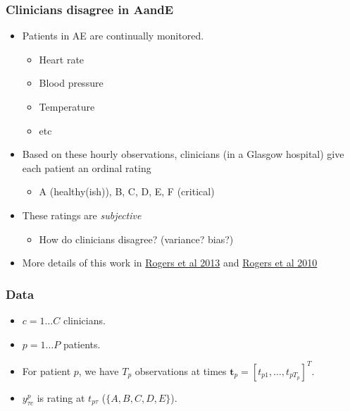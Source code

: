 

\begin{frame}
	\frametitle{Clinicians disagree in AandE}
	\begin{itemize}
		\item Patients in \ac{AE} are continually monitored.
		\begin{itemize}
			\item Heart rate
			\item Blood pressure
			\item Temperature
			\item etc
		\end{itemize}
		\item<2-> Based on these hourly observations, clinicians (in a Glasgow hospital) give each patient an ordinal rating
		\begin{itemize}
			\item A (healthy(ish)), B, C, D, E, F (critical)
		\end{itemize}
		\item<3->These ratings are \emph{subjective}
		\begin{itemize}
			\item How do clinicians disagree? (variance? bias?)
		\end{itemize}
		\item<3->More details of this work in \href{http://dx.doi.org/10.1109/JBHI.2013.2252182}{Rogers et al 2013} and \href{http://dx.doi.org/10.1007/s11222-009-9125-z}{Rogers et al 2010}
	\end{itemize}
\end{frame}

\begin{frame}
	\frametitle{Data}
	\begin{itemize}
		\item $c = 1\ldots C$ clinicians.
		\item $p=1\ldots P$ patients.
		\item For patient $p$, we have $T_p$ observations at times $\mathbf{t}_p = [t_{p1},\ldots,t_{pT_p}]^T$.
		\item $y_{\tau c}^p$ is rating at $t_{p\tau}$ ($\{A,B,C,D,E\}$).
	\end{itemize}
\end{frame}

